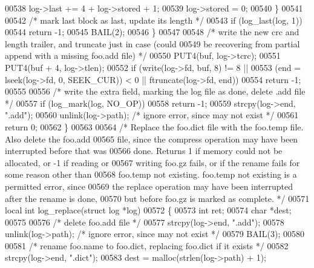 \begin{DoxyCode}
00538             log->last += 4 + log->stored + 1;
00539             log->stored = 0;
00540         \}
00541 
00542         \textcolor{comment}{/* mark last block as last, update its length */}
00543         \textcolor{keywordflow}{if} (log\_last(log, 1))
00544             \textcolor{keywordflow}{return} -1;
00545         BAIL(2);
00546     \}
00547 
00548     \textcolor{comment}{/* write the new crc and length trailer, and truncate just in case (could}
00549 \textcolor{comment}{       be recovering from partial append with a missing foo.add file) */}
00550     PUT4(buf, log->tcrc);
00551     PUT4(buf + 4, log->tlen);
00552     \textcolor{keywordflow}{if} (write(log->fd, buf, 8) != 8 ||
00553         (end = lseek(log->fd, 0, SEEK\_CUR)) < 0 || ftruncate(log->fd, end))
00554         \textcolor{keywordflow}{return} -1;
00555 
00556     \textcolor{comment}{/* write the extra field, marking the log file as done, delete .add file */}
00557     \textcolor{keywordflow}{if} (log\_mark(log, NO\_OP))
00558         \textcolor{keywordflow}{return} -1;
00559     strcpy(log->end, \textcolor{stringliteral}{".add"});
00560     unlink(log->path);          \textcolor{comment}{/* ignore error, since may not exist */}
00561     \textcolor{keywordflow}{return} 0;
00562 \}
00563 
00564 \textcolor{comment}{/* Replace the foo.dict file with the foo.temp file.  Also delete the foo.add}
00565 \textcolor{comment}{   file, since the compress operation may have been interrupted before that was}
00566 \textcolor{comment}{   done.  Returns 1 if memory could not be allocated, or -1 if reading or}
00567 \textcolor{comment}{   writing foo.gz fails, or if the rename fails for some reason other than}
00568 \textcolor{comment}{   foo.temp not existing.  foo.temp not existing is a permitted error, since}
00569 \textcolor{comment}{   the replace operation may have been interrupted after the rename is done,}
00570 \textcolor{comment}{   but before foo.gz is marked as complete. */}
00571 local \textcolor{keywordtype}{int} log\_replace(\textcolor{keyword}{struct} log *log)
00572 \{
00573     \textcolor{keywordtype}{int} ret;
00574     \textcolor{keywordtype}{char} *dest;
00575 
00576     \textcolor{comment}{/* delete foo.add file */}
00577     strcpy(log->end, \textcolor{stringliteral}{".add"});
00578     unlink(log->path);         \textcolor{comment}{/* ignore error, since may not exist */}
00579     BAIL(3);
00580 
00581     \textcolor{comment}{/* rename foo.name to foo.dict, replacing foo.dict if it exists */}
00582     strcpy(log->end, \textcolor{stringliteral}{".dict"});
00583     dest = malloc(strlen(log->path) + 1);

\end{DoxyCode}
